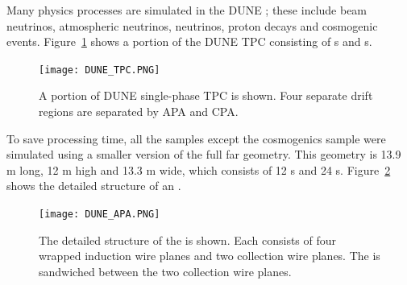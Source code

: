


Many physics processes are simulated in the DUNE ; these include beam neutrinos, atmospheric neutrinos,  neutrinos, proton decays and cosmogenic events. Figure~\ref{fig:dune_tpc} shows a portion of the DUNE \single TPC consisting of s and s.

\begin{figure}[!ht]
\centering
\texttt{[image: DUNE\_TPC.PNG]}
\caption{A portion of DUNE single-phase TPC is shown. Four separate drift regions are separated by APA and CPA. }
\label{fig:dune_tpc}
\end{figure}

To save processing time, all the  samples except the cosmogenics sample were simulated using a smaller version of the full \nominalmodsize far  geometry. This geometry is 13.9 m long, 12 m high and 13.3 m wide, which consists of 12 s and 24 s. %
Figure~\ref{fig:dune_apa} shows the detailed structure of an . %

\begin{figure}[!ht]
\centering
\texttt{[image: DUNE\_APA.PNG]}
\caption{The detailed structure of the  is shown. Each  consists of four wrapped induction wire planes and two collection wire planes.
The  is sandwiched between the two collection wire planes.}
\label{fig:dune_apa}
\end{figure}

